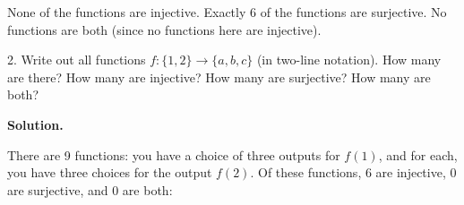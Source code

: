 \documentclass[10pt,]{book}
\theoremstyle{plain}
\theoremstyle{definition}
\theoremstyle{definition}
\theoremstyle{definition}
\numberwithin{equation}{section}
\begin{document}
\begin{exerciselist}


            None of the functions are injective. Exactly 6 of the functions are surjective. No functions are both (since no functions here are injective).
\item[2.]\hypertarget{exercise-28}{}
            Write out all functions \(f: \{1,2\} \to \{a,b,c\}\) (in two-line notation). How many are there? How many are injective? How many are surjective? How many are both?
\par\smallskip
\par\smallskip
\noindent\textbf{Solution.}\hypertarget{solution-46}{}\quad

            There are 9 functions: you have a choice of three outputs for \(f(1)\), and for each, you have three choices for the output \(f(2)\). Of these functions, 6 are injective, 0 are surjective, and 0 are both:


\end{exerciselist}
\end{document}

